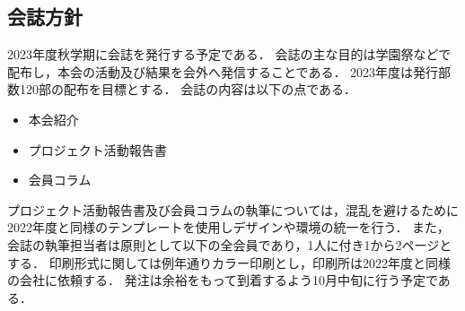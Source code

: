 \subsection*{会誌方針}




2023年度秋学期に会誌を発行する予定である．
会誌の主な目的は学園祭などで配布し，本会の活動及び結果を会外へ発信することである．
2023年度は発行部数120部の配布を目標とする．
会誌の内容は以下の点である．
\begin{itemize}
	\item 本会紹介
	\item プロジェクト活動報告書
	\item 会員コラム
\end{itemize}
プロジェクト活動報告書及び会員コラムの執筆については，混乱を避けるために2022年度と同様のテンプレートを使用しデザインや環境の統一を行う．
また，会誌の執筆担当者は原則として\thirdGrade{}以下の全会員であり，1人に付き1から2ページとする．
印刷形式に関しては例年通りカラー印刷とし，印刷所は2022年度と同様の会社に依頼する．
発注は余裕をもって到着するよう10月中旬に行う予定である．
